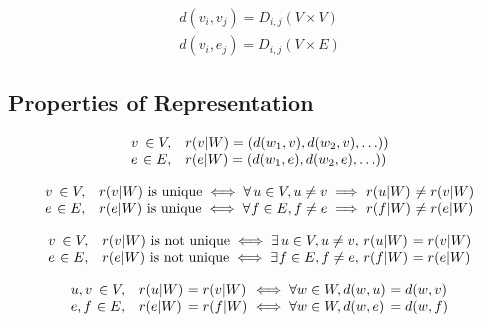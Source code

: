 \begin{corollary}
	\[\begin{array}{c}
		d(v_i,v_j) = D_{i,j}(V \times V) \\
		d(v_i,e_j) = D_{i,j}(V \times E)
	\end{array}\]
\end{corollary}

\cleardoublepage
\subsection{Properties of Representation}

\begin{definition}
	\[\begin{array}{l@{\ }r l}
		v &\in V, & r(v|W) = (d(w_1,v), d(w_2,v), \ldots)) \\
		e &\in E, & r(e|W) = (d(w_1,e), d(w_2,e), \ldots))
	\end{array}\]
\end{definition}

\begin{definition}
	\[\begin{array}{l@{\ }r l@{}r@{\ }l@{\ }l}
		v &\in V, & r(v|W) \text{ is unique} \iff \forall &u \in V, u \neq v \implies & r(u|W) &\neq r(v|W) \\
		e &\in E, & r(e|W) \text{ is unique} \iff \forall &f \in E, f \neq e \implies & r(f|W) &\neq r(e|W)
	\end{array}\]
\end{definition}

\begin{corollary}
	\[\begin{array}{l@{\ }r l@{}r@{\ }l@{\ }l}
		v &\in V, & r(v|W) \text{ is not unique} \iff \exists& u \in V, u \neq v, & r(u|W) &= r(v|W) \\
		e &\in E, & r(e|W) \text{ is not unique} \iff \exists& f \in E, f \neq e, & r(f|W) &= r(e|W)
	\end{array}\]
\end{corollary}

\begin{definition}
	\[\begin{array}{l@{\ }r l@{\ }l@{\ }l@{\ }l}
		u, v &\in V, & r(u|W) &= r(v|W) &\iff \forall w \in W, d(w,u) &= d(w,v) \\
		e, f &\in E, & r(e|W) &= r(f|W) &\iff \forall w \in W, d(w,e) &= d(w,f)
	\end{array}\]
\end{definition}

